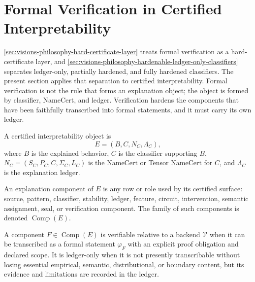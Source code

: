 \section{Formal Verification in Certified Interpretability}
\label{sec:visions-philosophy-formal-verification-certified-interpretability}

\autoref{sec:visions-philosophy-hard-certificate-layer} treats formal
verification as a hard-certificate layer, and
\autoref{sec:visions-philosophy-hardenable-ledger-only-classifiers}
separates ledger-only, partially hardened, and fully hardened
classifiers. The present section applies that separation to certified
interpretability. Formal verification is not the rule that forms an
explanation object; the object is formed by classifier, NameCert, and
ledger. Verification hardens the components that have been faithfully
transcribed into formal statements, and it must carry its own ledger.

\begin{definition}
\label{def:philosophy-certified-interpretability-object}
A certified interpretability object is
$$
E=(B,C,N_C,\Lambda_C),
$$
where $B$ is the explained behavior, $C$ is the classifier supporting
$B$, $N_C=(S_C,P_C,C,\Sigma_C,L_C)$ is the NameCert or Tensor NameCert
for $C$, and $\Lambda_C$ is the explanation ledger.
\end{definition}

\begin{definition}
\label{def:philosophy-explanation-component}
An explanation component of $E$ is any row or role used by its certified
surface: source, pattern, classifier, stability, ledger, feature,
circuit, intervention, semantic assignment, seal, or verification
component. The family of such components is denoted
$\operatorname{Comp}(E)$.
\end{definition}

\begin{definition}
\label{def:philosophy-verifiable-explanation-component}
A component $F\in\operatorname{Comp}(E)$ is verifiable relative to a
backend $\mathcal V$ when it can be transcribed as a formal statement
$\varphi_F$ with an explicit proof obligation and declared scope. It is
ledger-only when it is not presently transcribable without losing
essential empirical, semantic, distributional, or boundary content, but
its evidence and limitations are recorded in the ledger.
\end{definition}


